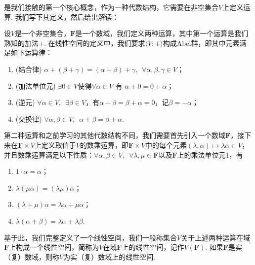 是我们接触的第一个核心概念，作为一种代数结构，它需要在非空集合$V$上定义运算. 我们写下其定义，然后给出解读：
\begin{definition}[线性空间]
    设$V$是一个非空集合，$\mathbf{F}$是一个数域，我们定义两种运算，其中第一个运算是我们熟知的加法$+$. 在线性空间的定义中，我们要求$\langle V:+\rangle$构成Abel群，即其中元素满足如下运算律：
    \begin{enumerate}
        \item (结合律) $\alpha+(\beta+\gamma)=(\alpha+\beta)+\gamma,\enspace\forall \alpha,\beta,\gamma \in V$；

        \item (加法单位元) $\exists 0 \in V$使得$\forall\alpha\in V$ 有 $\alpha+0=0+\alpha$；

        \item (逆元) $\forall\alpha\in V,\enspace \exists \beta \in V$，有$\alpha+\beta=\beta+\alpha=0$，记$\beta=-\alpha$；

        \item (交换律) $\forall\alpha, \beta\in V,\enspace \alpha+\beta=\beta+\alpha$.
    \end{enumerate}

    第二种运算和之前学习的其他代数结构不同，我们需要首先引入一个数域$\mathbf{F}$，接下来在$\mathbf{F}\times V$上定义取值于$V$的数乘运算，即$\mathbf{F}\times V$中的每个元素$(\lambda,\alpha)\mapsto \lambda\alpha\in V$，并且数乘运算满足以下性质：$\forall \alpha,\beta \in V,\enspace\forall \lambda,\mu\in\mathbf{F}$以及$\mathbf{F}$上的乘法单位元1，有
    \begin{enumerate}
        \item $1\cdot \alpha=\alpha$；

        \item $\lambda(\mu\alpha)=(\lambda\mu)\alpha$；

        \item $(\lambda+\mu)\alpha=\lambda\alpha+\mu\alpha$；

        \item $\lambda(\alpha+\beta)=\lambda\alpha+\lambda\beta$.
    \end{enumerate}

    基于此，我们完整定义了一个线性空间，我们一般称集合$V$关于上述两种运算在域$\mathbf{F}$上构成一个线性空间，简称为$V$在域$\mathbf{F}$上的线性空间，记作$V(\mathbf{F})$. 如果$\mathbf{F}$是实（复）数域，则称$V$为实（复）数域上的线性空间.
\end{definition}

